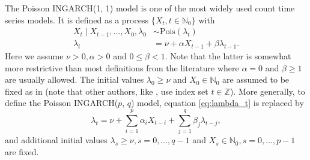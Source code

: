 \documentclass{article}
\begin{document}
The Poisson INGARCH(1, 1) model \cite{Ferland2006, Fokianos2009} is one of the most widely used count time series models. It is defined as a process $\{X_t, t \in \mathbb{N}_0\}$ with
\begin{align}
X_t \mid X_{t - 1}, \dots, X_0, \lambda_0 & \sim \text{Pois}(\lambda_t)\label{eq:X_t_original}\\
\lambda_t & = \nu + \alpha X_{t - 1} + \beta \lambda_{t - 1}. \label{eq:lambda_t}
\end{align}
Here we assume $\nu > 0, \alpha > 0$ and $0 \leq \beta < 1$. Note that the latter is somewhat more restrictive than most definitions from the literature where $\alpha = 0$ and $\beta \geq 1$ are usually allowed. The initial values $\lambda_0 \geq \nu$ and $X_0 \in \mathbb{N}_0$ are assumed to be fixed as in \cite{Fokianos2009} (note that other authors, like \citep{Ferland2006}, use index set $t \in \mathbb{Z}$). More generally, to define the Poisson INGARCH($p$, $q$) model, equation \eqref{eq:lambda_t} is replaced by
\begin{equation}
\lambda_t = \nu + \sum_{i = 1}^p \alpha_i X_{t - i} + \sum_{j = 1}^q \beta_j \lambda_{t - j},\label{eq:lambda_t_pq}
\end{equation}
and additional initial values $\lambda_{s} \geq \nu, s = 0, \dots, q - 1$ and $X_{s} \in \mathbb{N}_0, s = 0, \dots, p - 1$ are fixed.
\end{document}
